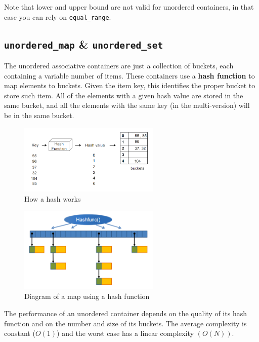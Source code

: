 Note that lower and upper bound are not valid for unordered containers, in that case you can 
rely on \texttt{equal\_range}.

\subsection{\texttt{unordered\_map} \& \texttt{unordered\_set}}

The unordered associative containers are just a collection of buckets, each containing a variable
number of items. These containers use a \textbf{hash function} to map elements to buckets. Given
the item key, this identifies the proper bucket to store such item. All of the elements with a 
given hash value are stored in the same bucket, and all the elements with the same key (in the
multi-version) will be in the same bucket.

\begin{figure}[H]
    \centering
    \includegraphics[width=0.6\textwidth]{figures/hash_working.png}
    \caption{How a hash works}
    \label{fig:hash_working}
\end{figure}

\begin{figure}[H]
    \centering
    \includegraphics[width=0.6\textwidth]{figures/hash_diagram.png}
    \caption{Diagram of a map using a hash function}
    \label{fig:hash_diagram}
\end{figure}


The performance of an unordered container depends on the quality of its hash
function and on the number and size of its buckets. The average complexity is
constant ($O(1)$) and the worst case has a linear complexity $(O(N))$.\\

